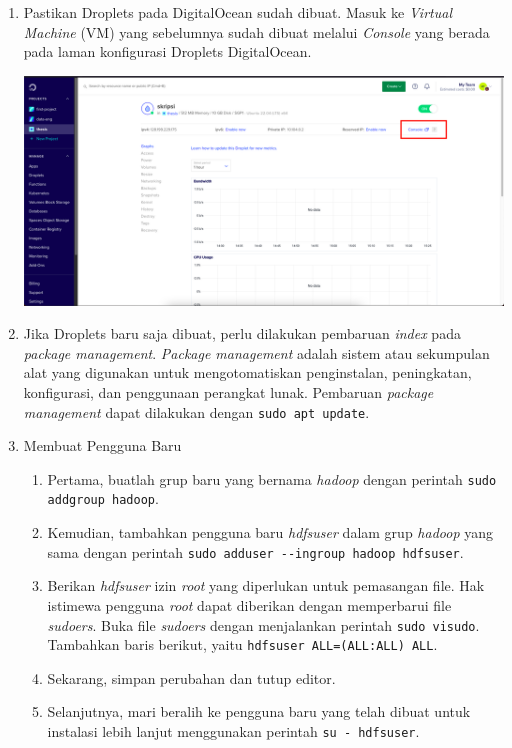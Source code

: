 \begin{enumerate}
  \item Pastikan Droplets pada DigitalOcean sudah dibuat. Masuk ke \textit{Virtual Machine} (VM) yang sebelumnya sudah dibuat melalui \textit{Console} yang berada pada laman konfigurasi Droplets DigitalOcean.
	\begin{center}
	\includegraphics[width=1\linewidth]{figures/ch99/ap1/5.png}
	\end{center} 
  \item Jika Droplets baru saja dibuat, perlu dilakukan pembaruan \textit{index} pada \textit{package management}. \textit{Package management} adalah sistem atau sekumpulan alat yang digunakan untuk mengotomatiskan penginstalan, peningkatan, konfigurasi, dan penggunaan perangkat lunak. Pembaruan \textit{package management} dapat dilakukan dengan \verb|sudo apt update|. 
  \item Membuat Pengguna Baru   \begin{enumerate}
    \item Pertama, buatlah grup baru yang bernama \textit{hadoop} dengan perintah \verb|sudo addgroup hadoop|.
    \item Kemudian, tambahkan pengguna baru \textit{hdfsuser} dalam grup \textit{hadoop} yang sama dengan perintah \verb|sudo adduser --ingroup hadoop hdfsuser|.
    \item Berikan \textit{hdfsuser} izin \textit{root} yang diperlukan untuk pemasangan file. Hak istimewa pengguna \textit{root} dapat diberikan dengan memperbarui file \textit{sudoers}. Buka file \textit{sudoers} dengan menjalankan perintah \verb|sudo visudo|. Tambahkan baris berikut, yaitu \verb|hdfsuser ALL=(ALL:ALL) ALL|.
    \item Sekarang, simpan perubahan dan tutup editor.
    \item Selanjutnya, mari beralih ke pengguna baru yang telah dibuat untuk instalasi lebih lanjut menggunakan perintah \verb|su - hdfsuser|.

\end{enumerate}
\end{enumerate}

